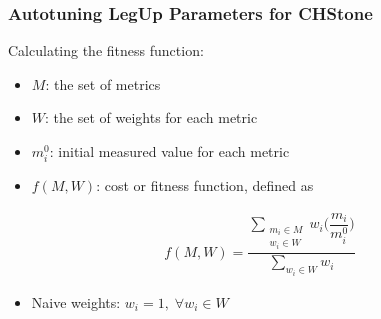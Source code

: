 \documentclass[10pt, compress, aspectratio=169]{beamer}
\begin{document}
\begin{frame}
    \frametitle{Autotuning LegUp Parameters for CHStone}
    Calculating the \alert{fitness function}:

    \begin{itemize}
        \item $M$: the set of \alert{metrics}
        \item $W$: the set of \alert{weights for each metric}
        \item $m_{i}^{0}$: \alert{initial measured value} for each metric
        \item $f(M,W)$: \alert{cost} or \alert{fitness function}, defined as
    \end{itemize}
    \begin{align*}
        f(M, W) = \dfrac{\sum\limits_{\substack{m_i \in M \\ w_i \in W}}{w_i\Big(\dfrac{m_i}{m_{i}^{0}}\Big)}}{\sum\limits_{w_i \in W}{w_i}}
    \end{align*}
    \begin{itemize}
        \item \alert{Naive weights}: $w_i = 1, \; \forall w_i \in W$
    \end{itemize}
\end{frame}
\end{document}
